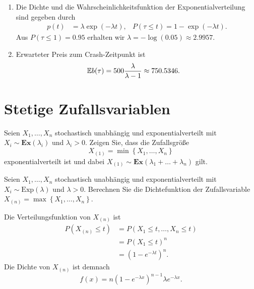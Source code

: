 \solution
\begin{enumerate}
    \item Die Dichte und die Wahrscheinlichkeitsfunktion der Exponentialverteilung sind gegeben 
        durch
        \begin{align*}
            p(t) &= \lambda \exp\left( -\lambda t \right), & P(\tau \leq t) = 1- \exp( - \lambda t). 
        \end{align*}
        Aus $P( \tau \leq 1 ) = 0.95$ erhalten wir $\lambda = - \log\left( 0.05 \right) \approx 2.9957$.
    \item Erwarteter Preis zum Crash-Zeitpunkt ist 
        \begin{align*}
            \mathbb{E} b(\tau) &= 500 \frac{\lambda}{\lambda-1} \approx 750.5346.
        \end{align*}
\end{enumerate}


\section{Stetige Zufallsvariablen}


Seien $X_1, \dots, X_n$ stochastisch unabhängig und exponentialverteilt mit
$X_i\sim \mathbf{Ex}(\lambda_i)$ und $\lambda_i>0$. Zeigen Sie, dass die
Zufallsgröße 
\begin{equation*}
    X_{(1)} = \min \left\{ X_1, \dots, X_n \right\} 
\end{equation*}
exponentialverteilt ist und dabei $X_{(1)} \sim \mathbf{Ex}(\lambda_1+\dots+\lambda_n)$ gilt.


 Seien $X_1, \dots, X_n$
stochastisch unabhängig und exponentialverteilt mit $X_i\sim
\text{Exp}(\lambda)$ und $\lambda>0$. Berechnen Sie die Dichtefunktion der
Zufallsvariable $X_{(n)} = \max \left\{ X_1,\dots ,X_n \right\}$.

\solution Die Verteilungsfunktion von $X_{(n)}$ ist 
\begin{align*}
    P\left( X_{(n)} \leq t \right) &= P\left( X_1 \leq t,\dots ,X_n \leq t \right) \\
    &= P\left( X_1 \leq t \right)^{n} \\
    &= \left( 1- e^{-\lambda t} \right)^{n}. 
\end{align*}
Die Dichte von $X_{(n)}$ ist demnach
\begin{equation*}
    f(x) = n \left( 1- e^{-\lambda x} \right)^{n-1} \lambda e^{-\lambda x}. 
\end{equation*}


